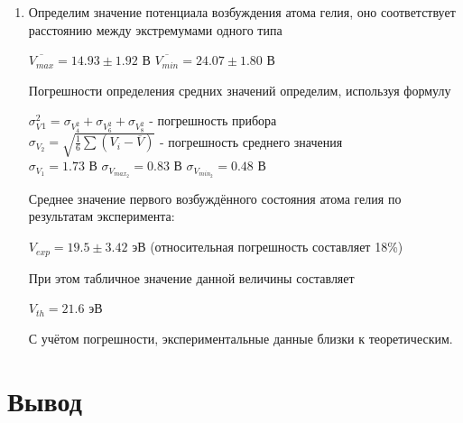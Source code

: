 \documentclass[a4paper]{article}
\begin{document}
\begin{enumerate}
\begin{table}[h]
\begin{tabular}{ |p{3.5cm}||p{1.5cm}|p{1.5cm}|p{1.5cm}|p{1.5cm}|p{2.5cm}|p{1.5cm}|p{1.5cm}|}
\end{tabular}
\end{table} 

\item Определим значение потенциала возбуждения атома гелия, оно соответствует расстоянию между экстремумами одного типа
\begin{center}
    $\overline{V_{max}} = 14.93 \pm 1.92$ В \hspace{1cm} $\overline{V_{min}} = 24.07 \pm 1.80$ В
\end{center}
Погрешности определения средних значений определим, используя формулу
\begin{center}
    $\sigma_V^2_1 = \sigma_V_4^2 + \sigma_V_6^2 + \sigma_V_8^2$ - погрешность прибора \\
    $\sigma_V_2 = \sqrt{\frac{1}{6}\sum (V_i - \overline{V})}$ -  погрешность среднего значения \\
    $\sigma_V_1 = 1.73$ В \hspace{1cm} $\sigma_V_{max}_2 = 0.83 $ В  \hspace{1cm} $\sigma_V_{min}_2 = 0.48$ В
\end{center}

Среднее значение первого возбуждённого состояния атома гелия по результатам эксперимента:
\begin{center}
    $V_{exp} = 19.5 \pm 3.42$ эВ (относительная погрешность составляет 18\%)
\end{center}
При этом табличное значение данной величины составляет
\begin{center}
    $V_{th} = 21.6$ эВ
\end{center}
С учётом погрешности, экспериментальные данные близки к теоретическим.

\end{enumerate}    

\newpage

\section{Вывод}
\end{document}
